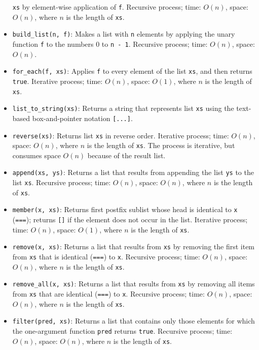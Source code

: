 \begin{itemize}
  \lstinline{xs} by element-wise application of \lstinline{f}. 
Recursive process; time: $O(n)$, space: $O(n)$, where $n$ is the length of \lstinline{xs}.
\item \lstinline{build_list(n, f)}: Makes a list with \lstinline{n}
elements by applying the unary function \lstinline{f} to the numbers 0 to \lstinline{n - 1}.
Recursive process; time: $O(n)$, space: $O(n)$.
\item \lstinline{for_each(f, xs)}: Applies \lstinline{f} to every
  element of the list \lstinline{xs}, and then returns
  \lstinline{true}. 
Iterative process; time: $O(n)$, space: $O(1)$, where $n$ is the length of \lstinline{xs}.
\item \lstinline{list_to_string(xs)}: Returns a string that represents
list \lstinline{xs} using the text-based box-and-pointer notation \lstinline{[...]}.
\item \lstinline{reverse(xs)}: Returns list \lstinline{xs} in reverse
  order. Iterative process; time: $O(n)$, space: $O(n)$, where $n$ is the length of \lstinline{xs}.
The process is iterative, but consumes space $O(n)$ because of the result list.
\item \lstinline{append(xs, ys)}: Returns a list that results from 
appending the list \lstinline{ys} to the list \lstinline{xs}.
Recursive process; time: $O(n)$, space: $O(n)$, where $n$ is the length of \lstinline{xs}.
\item \lstinline{member(x, xs)}: Returns first postfix sublist
whose head is identical to
\lstinline{x} (\lstinline{===}); returns \lstinline{[]} if the
element does not occur in the list.
Iterative process; time: $O(n)$, space: $O(1)$, where $n$ is the length of \lstinline{xs}.
\item \lstinline{remove(x, xs)}: Returns a list that results from
\lstinline{xs} by removing the first item from \lstinline{xs} that
is identical (\lstinline{===}) to \lstinline{x}. Recursive process;
time: $O(n)$, space: $O(n)$, where $n$ is the length of \lstinline{xs}.
\item \lstinline{remove_all(x, xs)}: Returns a list that results from
\lstinline{xs} by removing all items from \lstinline{xs} that
are identical (\lstinline{===}) to \lstinline{x}.
Recursive process;
time: $O(n)$, space: $O(n)$, where $n$ is the length of \lstinline{xs}.
\item \lstinline{filter(pred, xs)}: Returns a list that contains
only those elements for which the one-argument function
\lstinline{pred}
returns \lstinline{true}.
Recursive process;
time: $O(n)$, space: $O(n)$, where $n$ is the length of \lstinline{xs}.

\end{itemize}
